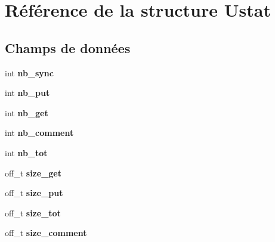 \hypertarget{struct_ustat}{\section{Référence de la structure Ustat}
\label{struct_ustat}
}
\subsection*{Champs de données}
\begin{DoxyCompactItemize}
\item 
\hypertarget{struct_ustat_a1b3d4d20a7d1b8d3232a35dd689ecfc9}{int {\bfseries nb\-\_\-sync}}\label{struct_ustat_a1b3d4d20a7d1b8d3232a35dd689ecfc9}

\item 
\hypertarget{struct_ustat_a6c53f9a18d82d8b3eb69db87bebb5278}{int {\bfseries nb\-\_\-put}}\label{struct_ustat_a6c53f9a18d82d8b3eb69db87bebb5278}

\item 
\hypertarget{struct_ustat_a9c5fc500b4e111d67e3116a98fc0079a}{int {\bfseries nb\-\_\-get}}\label{struct_ustat_a9c5fc500b4e111d67e3116a98fc0079a}

\item 
\hypertarget{struct_ustat_a3b935650d378d427a56b873a84a80106}{int {\bfseries nb\-\_\-comment}}\label{struct_ustat_a3b935650d378d427a56b873a84a80106}

\item 
\hypertarget{struct_ustat_ab546ca1885cfe0cb636237597b6c03ea}{int {\bfseries nb\-\_\-tot}}\label{struct_ustat_ab546ca1885cfe0cb636237597b6c03ea}

\item 
\hypertarget{struct_ustat_ae2c60a5b9873f763ab7636ef25953c00}{off\-\_\-t {\bfseries size\-\_\-get}}\label{struct_ustat_ae2c60a5b9873f763ab7636ef25953c00}

\item 
\hypertarget{struct_ustat_a750fc6b8808d30cb4c5c262e2ae81e80}{off\-\_\-t {\bfseries size\-\_\-put}}\label{struct_ustat_a750fc6b8808d30cb4c5c262e2ae81e80}

\item 
\hypertarget{struct_ustat_a98544d36afdaaa3f139da8f248c2bb99}{off\-\_\-t {\bfseries size\-\_\-tot}}\label{struct_ustat_a98544d36afdaaa3f139da8f248c2bb99}

\item 
\hypertarget{struct_ustat_a33a60d65e3b7ae90db3421d39935178a}{off\-\_\-t {\bfseries size\-\_\-comment}}\label{struct_ustat_a33a60d65e3b7ae90db3421d39935178a}


\end{DoxyCompactItemize}
